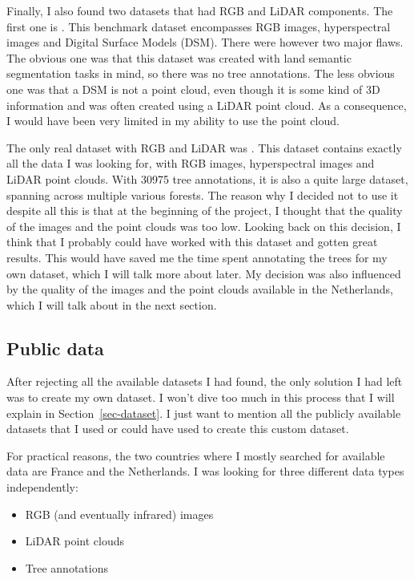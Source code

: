 \documentclass[
]{report}
\providecommand{\tightlist}{%
  \setlength{\itemsep}{0pt}\setlength{\parskip}{0pt}}\usepackage{longtable,booktabs,array}
\begin{document}
Finally, I also found two datasets that had RGB and LiDAR components.
The first one is \autocite{MDAS}. This benchmark dataset encompasses RGB
images, hyperspectral images and Digital Surface Models (DSM). There
were however two major flaws. The obvious one was that this dataset was
created with land semantic segmentation tasks in mind, so there was no
tree annotations. The less obvious one was that a DSM is not a point
cloud, even though it is some kind of 3D information and was often
created using a LiDAR point cloud. As a consequence, I would have been
very limited in my ability to use the point cloud.

The only real dataset with RGB and LiDAR was \autocite{NEON}. This
dataset contains exactly all the data I was looking for, with RGB
images, hyperspectral images and LiDAR point clouds. With 30975 tree
annotations, it is also a quite large dataset, spanning across multiple
various forests. The reason why I decided not to use it despite all this
is that at the beginning of the project, I thought that the quality of
the images and the point clouds was too low. Looking back on this
decision, I think that I probably could have worked with this dataset
and gotten great results. This would have saved me the time spent
annotating the trees for my own dataset, which I will talk more about
later. My decision was also influenced by the quality of the images and
the point clouds available in the Netherlands, which I will talk about
in the next section.

\subsection{Public data}\label{public-data}

After rejecting all the available datasets I had found, the only
solution I had left was to create my own dataset. I won't dive too much
in this process that I will explain in Section~\ref{sec-dataset}. I just
want to mention all the publicly available datasets that I used or could
have used to create this custom dataset.

For practical reasons, the two countries where I mostly searched for
available data are France and the Netherlands. I was looking for three
different data types independently:

\begin{itemize}
\tightlist
\item
  RGB (and eventually infrared) images
\item
  LiDAR point clouds
\item
  Tree annotations
\end{itemize}
\end{document}
